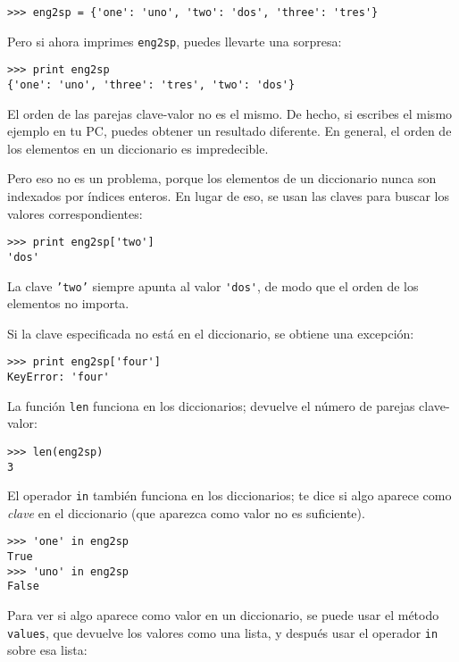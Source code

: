 \beforeverb
\begin{verbatim}
>>> eng2sp = {'one': 'uno', 'two': 'dos', 'three': 'tres'}
\end{verbatim}
\afterverb
%
Pero si ahora imprimes {\tt eng2sp}, puedes llevarte una sorpresa:

\beforeverb
\begin{verbatim}
>>> print eng2sp
{'one': 'uno', 'three': 'tres', 'two': 'dos'}
\end{verbatim}
\afterverb
%
El orden de las parejas clave-valor no es el mismo. De hecho, si
escribes el mismo ejemplo en tu PC, puedes obtener un
resultado diferente. En general, el orden de los elementos en
un diccionario es impredecible.

Pero eso no es un problema, porque
los elementos de un diccionario nunca son indexados por índices enteros.
En lugar de eso, se usan las claves para buscar los valores correspondientes:

\beforeverb
\begin{verbatim}
>>> print eng2sp['two']
'dos'
\end{verbatim}
\afterverb
%
La clave {\tt 'two'} siempre apunta al valor \verb"'dos'", de modo que el orden
de los elementos no importa.

Si la clave especificada no está en el diccionario, se obtiene una excepción:


\beforeverb
\begin{verbatim}
>>> print eng2sp['four']
KeyError: 'four'
\end{verbatim}
\afterverb
%
La función {\tt len} funciona en los diccionarios; devuelve el
número de parejas clave-valor:


\beforeverb
\begin{verbatim}
>>> len(eng2sp)
3
\end{verbatim}
\afterverb
%
El operador {\tt in} también funciona en los diccionarios; te dice si
algo aparece como \emph{clave} en el diccionario (que aparezca
como valor no es suficiente).


\beforeverb
\begin{verbatim}
>>> 'one' in eng2sp
True
>>> 'uno' in eng2sp
False
\end{verbatim}
\afterverb
%
Para ver si algo aparece como valor en un diccionario, se
puede usar el método {\tt values}, que devuelve los valores como
una lista, y después usar el operador {\tt in} sobre esa lista:


